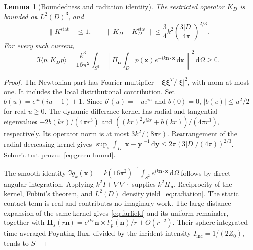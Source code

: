 \documentclass[11pt]{article}
\newtheorem{lemma}[theorem]{Lemma}
\newcommand{\dd}{\,\mathrm{d}}
\newcommand{\ip}[2]{\langle #1,#2\rangle}
\newcommand{\norm}[1]{\lVert #1\rVert}
\newcommand{\abs}[1]{\lvert #1\rvert}
\begin{document}
\begin{lemma}[Boundedness and radiation identity]\label{lem:green}
The restricted operator $K_D$ is bounded on $L^2(D)^3$, and
\begin{equation}\label{eq:green-bound}
 \norm{K^{\mathrm{stat}}}\leq1,\qquad
 \norm{K_D-K^{\mathrm{stat}}_D}\leq\frac34 k^2
 \left(\frac{3\abs{D}}{4\pi}\right)^{2/3}.
\end{equation}
For every such current,
\begin{equation}\label{eq:radiation}
 \Im\ip{p}{K_Dp}
 =\frac{k^3}{16\pi^2}\int_{S^2}
 \left\lVert\Pi_{\mathbf n}\int_Dp(\mathbf x)e^{-ik\mathbf n\cdot\mathbf x}\dd\mathbf x\right\rVert^2\dd\Omega
 \geq0.
\end{equation}
\end{lemma}
\begin{proof}
The Newtonian part has Fourier multiplier $-\boldsymbol\xi\boldsymbol\xi^T/\abs{\boldsymbol\xi}^2$, with norm at most one. It includes the local distributional contribution. Set $b(u)=e^{iu}(iu-1)+1$. Since $b'(u)=-ue^{iu}$ and $b(0)=0$, $\abs{b(u)}\leq u^2/2$ for real $u\geq0$. The dynamic difference kernel has radial and tangential eigenvalues $-2b(kr)/(4\pi r^3)$ and $((kr)^2e^{ikr}+b(kr))/(4\pi r^3)$, respectively. Its operator norm is at most $3k^2/(8\pi r)$. Rearrangement of the radial decreasing kernel gives $\sup_{\mathbf x}\int_D\abs{\mathbf x-\mathbf y}^{-1}\dd\mathbf y\leq2\pi(3\abs{D}/(4\pi))^{2/3}$. Schur's test proves~\eqref{eq:green-bound}.

The smooth identity $\Im g_k(\mathbf x)=k(16\pi^2)^{-1}\int_{S^2}e^{ik\mathbf n\cdot\mathbf x}\dd\Omega$ follows by direct angular integration. Applying $k^2I+\nabla\nabla\cdot$ supplies $k^2\Pi_{\mathbf n}$. Reciprocity of the kernel, Fubini's theorem, and $L^2(D)$ density yield~\eqref{eq:radiation}. The static contact term is real and contributes no imaginary work. The large-distance expansion of the same kernel gives~\eqref{eq:farfield} and its uniform remainder, together with $\mathbf H_s(r\mathbf n)=e^{ikr}\mathbf n\times F_p(\mathbf n)/r+O(r^{-2})$. Their sphere-integrated time-averaged Poynting flux, divided by the incident intensity $I_{\mathrm{inc}}=1/(2Z_0)$, tends to $S$.
\end{proof}
\end{document}
